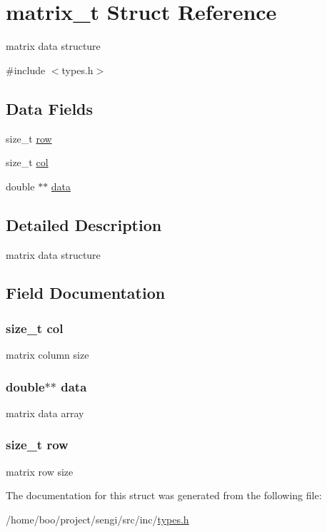 \hypertarget{structmatrix__t}{\section{matrix\+\_\+t Struct Reference}
\label{structmatrix__t}
}


matrix data structure  




{\ttfamily \#include $<$types.\+h$>$}

\subsection*{Data Fields}
\begin{DoxyCompactItemize}
\item 
size\+\_\+t \hyperlink{structmatrix__t_a97ab3b8ef2f074e3774c66099d7ec59b}{row}
\item 
size\+\_\+t \hyperlink{structmatrix__t_a72f49011b5605e0c59eabd1ab811cdfd}{col}
\item 
double $\ast$$\ast$ \hyperlink{structmatrix__t_ab337088dea6e2a8a685d4e9048b50759}{data}
\end{DoxyCompactItemize}


\subsection{Detailed Description}
matrix data structure 

\subsection{Field Documentation}
\hypertarget{structmatrix__t_a72f49011b5605e0c59eabd1ab811cdfd}{
\subsubsection[{col}]{\setlength{\rightskip}{0pt plus 5cm}size\+\_\+t col}}\label{structmatrix__t_a72f49011b5605e0c59eabd1ab811cdfd}
matrix column size \hypertarget{structmatrix__t_ab337088dea6e2a8a685d4e9048b50759}{
\subsubsection[{data}]{\setlength{\rightskip}{0pt plus 5cm}double$\ast$$\ast$ data}}\label{structmatrix__t_ab337088dea6e2a8a685d4e9048b50759}
matrix data array \hypertarget{structmatrix__t_a97ab3b8ef2f074e3774c66099d7ec59b}{
\subsubsection[{row}]{\setlength{\rightskip}{0pt plus 5cm}size\+\_\+t row}}\label{structmatrix__t_a97ab3b8ef2f074e3774c66099d7ec59b}
matrix row size 

The documentation for this struct was generated from the following file\+:\begin{DoxyCompactItemize}
\item 
/home/boo/project/sengi/src/inc/\hyperlink{types_8h}{types.\+h}\end{DoxyCompactItemize}
